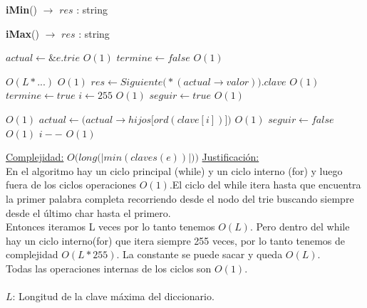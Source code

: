 \begin{Algoritmos}
\begin{algorithm}[H]{\textbf{iMin}() $\to$ $res$ : string}
\begin{algorithmic}
{        }
      \end{algorithmic}
\end{algorithm}

\begin{algorithm}[H]{\textbf{iMax}() $\to$ $res$ : string}
      \begin{algorithmic}
        \State $actual \gets \&e.trie$ \Comment $O(1)$
        \State $termine \gets false$ \Comment $O(1)$

         \Comment $O(L * ...)$
           \Comment $O(1)$
            \State $res \gets Siguiente\big(*(actual \to valor)\big).clave$ \Comment $O(1)$
            \State $termine \gets true $
          \Else
            \State $i \gets 255$ \Comment $O(1)$
            \State $seguir \gets true$ \Comment $O(1)$
            \State $ $

               \Comment $O(1)$
                \State $actual \gets \big(actual \to hijos\big[ord(clave[i])\big]\big)$ \Comment $O(1)$
                \State $seguir \gets false$ \Comment $O(1)$
              \EndIf
              \State $i--$ \Comment $O(1)$
            \EndWhile
          \EndIf
        \EndWhile

        \medskip
        \Statex \underline{Complejidad:} {$O\big(long\big(|min(claves(e))|\big)\big)$}
        \Statex \underline{Justificación:} {\\
\quad\quad En el algoritmo hay un ciclo principal (while)  y un ciclo interno (for) y luego fuera de los ciclos operaciones $O(1)$.El ciclo del while itera hasta que encuentra la primer palabra completa recorriendo desde el nodo del trie buscando siempre desde el último char hasta el primero. \\
\quad\quad Entonces iteramos L veces por lo tanto tenemos $O(L)$. Pero dentro del while hay un ciclo interno(for) que itera siempre 255 veces, por lo tanto tenemos de complejidad $O(L*255)$. La constante se puede sacar y queda $O(L)$.\\
\quad\quad Todas las operaciones internas de los ciclos son $O(1)$.\\
\\
\quad\quad $L$: Longitud de la clave máxima del diccionario.
        }
      \end{algorithmic}
\end{algorithm}

\end{Algoritmos}
